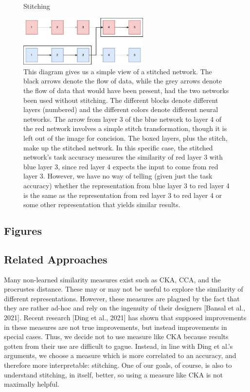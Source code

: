 \documentclass{article} %
\begin{document}
\begin{center}
   \begin{figure}[h!]
      \centering
      \caption{Stitching}
      \includegraphics[width=6.5cm]{stitch.jpg}
      \caption*{This diagram gives us a simple view of a stitched network. The black arrows denote the flow of data, while
      the grey arrows denote the flow of data that would have been present, had the two networks been used without stitching.
      The different blocks denote different layers (numbered) and the different colors denote different neural networks. The arrow
      from layer 3 of the blue network to layer 4 of the red network involves a simple stitch transformation, though it is left
      out of the image for concision. The boxed layers, plus the stitch, make up the stitched network. In this specific case,
      the stitched network's task accuracy measures the similarity of red layer 3 with blue layer 3, since red layer 4 expects the
      input to come from red layer 3. However, we have no way of telling (given just the task accuracy) whether the representation
      from blue layer 3 to red layer 4 is the same as the representation from red layer 3 to red layer 4 or some other representation
      that yields similar results.}
   \end{figure}
\end{center}
\subsection{Figures}

\subsection{Related Approaches}
Many non-learned similarity measures exist such as CKA, CCA, and the procrustes distance. These may or may not
be useful to explore the similarity of different representations. However, these measures are
plagued by the fact that they are rather ad-hoc and rely on the ingenuity of their designers [Bansal et al., 2021].
Recent research [Ding et al., 2021] has shown that supposed improvements in these measures are not true improvements,
but instead improvements in special cases. Thus, we decide not to use measure like CKA because results gotten from
their use are difficult to gague. Instead, in line with Ding et al.'s arguments, we choose a measure which is more correlated
to an accuracy, and therefore more interpretable: stitching. One of our goals, of course, is also to understand
stitching, in itself, better, so using a measure like CKA is not maximally helpful.
\end{document}
